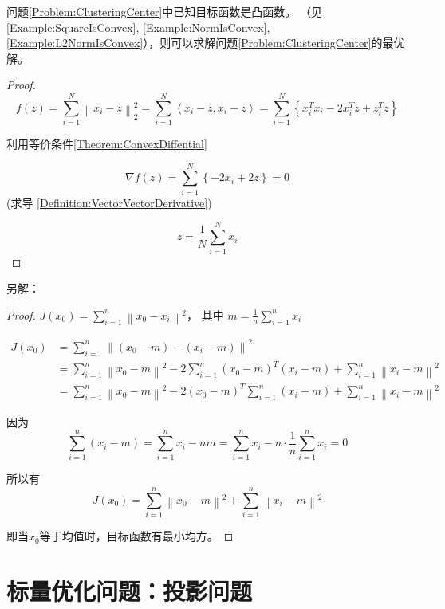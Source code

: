 问题\ref{Problem:ClusteringCenter}中已知目标函数是凸函数。 （见\ref{Example:SquareIsConvex}, \ref{Example:NormIsConvex}, \ref{Example:L2NormIsConvex}），则可以求解问题\ref{Problem:ClusteringCenter}的最优解。

\begin{proof}
    

$$ f(z)=\sum_{i=1}^{N}\left\|x_{i}-z\right\|_{2}^{2}=\sum_{i=1}^{N}\left\langle x_{i}-z, x_{i}-z\right\rangle=\sum_{i=1}^{N}\left\{x_{i}^{T} x_{i}-2 x_{i}^{T} z+z_{i}^{T} z\right\} $$

利用等价条件\ref{Theorem:ConvexDiffential}

$$ \nabla f(z)=\sum_{i=1}^{N}\left\{-2 x_{i}+2 z\right\}=0 $$ (求导 \ref{Definition:VectorVectorDerivative})

$$ z=\frac{1}{N} \sum_{i=1}^{N} x_{i} $$
\end{proof}

另解：

\begin{proof}
    $ J\left(x_{0}\right)=\sum_{i=1}^{n}\left\|x_{0}-x_{i}\right\|^{2} ， $ 其中 $ m=\frac{1}{n} \sum_{i=1}^{n} x_{i} $

    $$\begin{aligned}
        J\left(x_{0}\right)&=\sum_{i=1}^{n}\left\|\left(x_{0}-m\right)-\left(x_{i}-m\right)\right\|^{2} \\
        &=\sum_{i=1}^{n}\left\|x_{0}-m\right\|^{2}-2 \sum_{i=1}^{n}\left(x_{0}-m\right)^{T}\left(x_{i}-m\right)+\sum_{i=1}^{n}\left\|x_{i}-m\right\|^{2} \\
        &= \sum_{i=1}^{n}\left\|x_{0}-m\right\|^{2}-2\left(x_{0}-m\right)^{T} \sum_{i=1}^{n}\left(x_{i}-m\right)+\sum_{i=1}^{n}\left\|x_{i}-m\right\|^{2}
    \end{aligned}$$


因为
$$ \sum_{i=1}^{n}\left(x_{i}-m\right)=\sum_{i=1}^{n} x_{i}-n m=\sum_{i=1}^{n} x_{i}-n \cdot \frac{1}{n} \sum_{i=1}^{n} x_{i}=0 $$

所以有 $$ J\left(x_{0}\right)=\sum_{i=1}^{n}\left\|x_{0}-m\right\|^{2}+\sum_{i=1}^{n}\left\|x_{i}-m\right\|^{2} $$

即当$x_0$等于均值时，目标函数有最小均方。
\end{proof}

\section{标量优化问题：投影问题}

